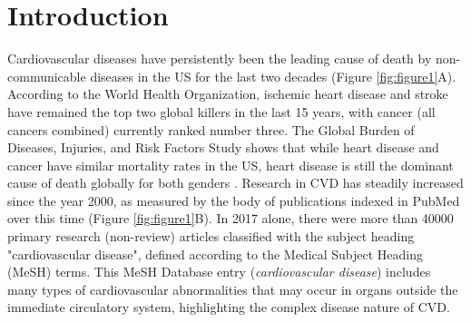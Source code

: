 \documentclass[letter]{bioinfo}
\begin{document}
\maketitle
	
\section*{Introduction}
	
Cardiovascular diseases have persistently been the leading cause of death by non-communicable diseases in the US for the last two decades (Figure \ref{fig:figure1}A).  According to the World Health Organization, ischemic heart disease and stroke have remained the top two global killers in the last 15 years, with cancer (all cancers combined) currently ranked number three.  The Global Burden of Diseases, Injuries, and Risk Factors Study shows that while heart disease and cancer have similar mortality rates in the US, heart disease is still the dominant cause of death globally for both genders \citep{Roth:2018:Global}.  Research in CVD has steadily increased since the year 2000, as measured by the body of publications indexed in PubMed over this time (Figure \ref{fig:figure1}B).  In 2017 alone, there were more than 40000 primary research (non-review) articles classified with the subject heading "cardiovascular disease", defined according to the Medical Subject Heading (MeSH) terms.  This MeSH Database entry (\textit{cardiovascular disease}) includes many types of cardiovascular abnormalities that may occur in organs outside the immediate circulatory system, highlighting the complex disease nature of CVD.
\end{document}
